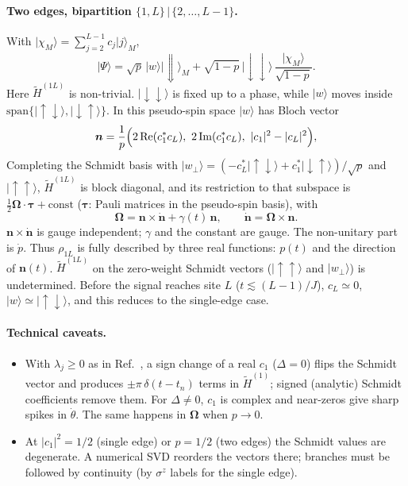 \documentclass[11pt]{article}
\newcommand{\ket}[1]{\lvert #1\rangle}
\newcommand{\up}{\uparrow}
\newcommand{\dn}{\downarrow}
\newcommand{\Ht}{\tilde H}
\begin{document}
\paragraph{Two edges, bipartition $\{1,L\}\,|\,\{2,\dots,L-1\}$.}
With $\ket{\chi_M}=\sum_{j=2}^{L-1}c_j\ket{j}_M$,
\begin{equation}
\ket{\Psi}=\sqrt p\,\ket{w}\ket{\Downarrow}_M+\sqrt{1-p}\,\ket{\dn\dn}\,\frac{\ket{\chi_M}}{\sqrt{1-p}} .
\end{equation}
Here $\Ht^{(1L)}$ is non-trivial. $\ket{\dn\dn}$ is fixed up to a phase, while $\ket w$ moves inside $\mathrm{span}\{\ket{\up\dn},\ket{\dn\up}\}$. In this pseudo-spin space $\ket w$ has Bloch vector
\begin{equation}
\bm n=\frac1p\Bigl(2\,\mathrm{Re}(c_1^*c_L),\ 2\,\mathrm{Im}(c_1^*c_L),\ |c_1|^2-|c_L|^2\Bigr),
\end{equation}
Completing the Schmidt basis with $\ket{w_\perp}=(-c_L^*\ket{\up\dn}+c_1^*\ket{\dn\up})/\sqrt p$ and $\ket{\up\up}$, $\Ht^{(1L)}$ is block diagonal, and its restriction to that subspace is $\tfrac12\bm\Omega\cdot\bm\tau+\text{const}$ ($\bm\tau$: Pauli matrices in the pseudo-spin basis), with
\begin{equation}
\bm\Omega=\bm n\times\dot{\bm n}+\gamma(t)\,\bm n,\qquad \dot{\bm n}=\bm\Omega\times\bm n .
\end{equation}
$\bm n\times\dot{\bm n}$ is gauge independent; $\gamma$ and the constant are gauge. The non-unitary part is $\dot p$.
Thus $\rho_{1L}$ is fully described by three real functions: $p(t)$ and the direction of $\bm n(t)$. $\Ht^{(1L)}$ on the zero-weight Schmidt vectors ($\ket{\up\up}$ and $\ket{w_\perp}$) is undetermined.
Before the signal reaches site $L$ ($t\lesssim(L-1)/J$), $c_L\simeq0$, $\ket w\simeq\ket{\up\dn}$, and this reduces to the single-edge case.

\paragraph{Technical caveats.}
\begin{itemize}
\item With $\lambda_j\ge0$ as in Ref.~\cite{MB22}, a sign change of a real $c_1$ ($\Delta=0$) flips the Schmidt vector and produces $\pm\pi\,\delta(t-t_n)$ terms in $\Ht^{(1)}$; signed (analytic) Schmidt coefficients remove them. For $\Delta\neq0$, $c_1$ is complex and near-zeros give sharp spikes in $\dot\theta$. The same happens in $\bm\Omega$ when $p\to0$.
\item At $|c_1|^2=1/2$ (single edge) or $p=1/2$ (two edges) the Schmidt values are degenerate. A numerical SVD reorders the vectors there; branches must be followed by continuity (by $\sigma^z$ labels for the single edge).
\end{itemize}
\end{document}
